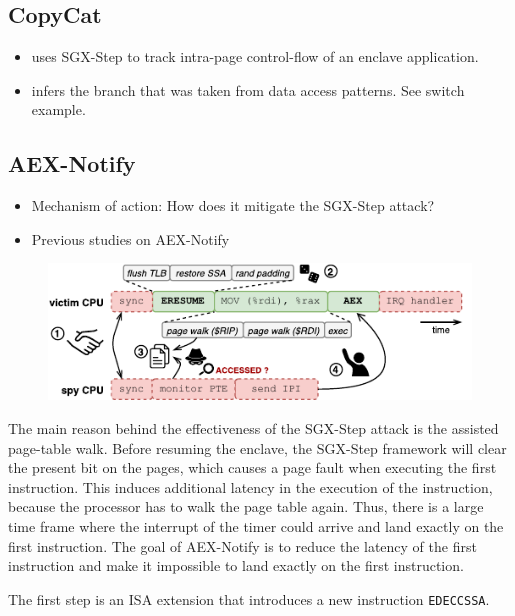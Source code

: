 \documentclass{llncs}
\begin{document}
\subsection{CopyCat}
\begin{itemize}
  \item uses SGX-Step to track intra-page control-flow of an enclave application.
  \item infers the branch that was taken from data access patterns. See switch example.
\end{itemize}

\subsection{AEX-Notify}
\begin{itemize}
  \item Mechanism of action: How does it mitigate the SGX-Step attack?
  \item Previous studies on AEX-Notify
\end{itemize}

\begin{figure}[t]
  \centering
  \includegraphics{images/sgx-step-pte.pdf}
  \caption{}
  \label{fig:sgx-step-pte}
\end{figure}

The main reason behind the effectiveness of the SGX-Step attack is the assisted
page-table walk.
Before resuming the enclave, the SGX-Step framework will clear the present bit
on the pages, which causes a page fault when executing the first instruction.
This induces additional latency in the execution of the instruction, because
the processor has to walk the page table again.
Thus, there is a large time frame where the interrupt of the timer could
arrive and land exactly on the first instruction.
The goal of AEX-Notify is to reduce the latency of the first instruction
and make it impossible to land exactly on the first instruction.

The first step is an ISA extension that introduces a new instruction \texttt{EDECCSSA}.
\end{document}
